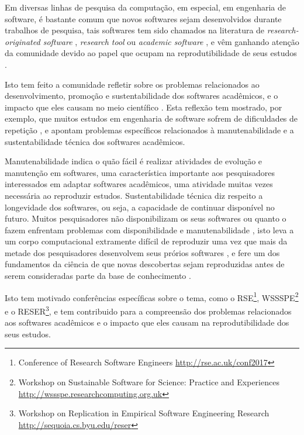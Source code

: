 
Em diversas linhas de pesquisa da computação, em especial, em engenharia de
software, é bastante comum que novos softwares sejam desenvolvidos durante
trabalhos de pesquisa, tais softwares tem sido chamados na literatura de {\it
research-originated software} \cite{Kon2011}, {\it research tool}
\cite{Portillo12} ou {\it academic software} \cite{allen2017engineering}, e vêm
ganhando atenção da comunidade devido ao papel que ocupam na reprodutibilidade
de seus estudos \cite{Peng2011}.

Isto tem feito a comunidade refletir sobre os problemas relacionados ao
desenvolvimento, promoção e sustentabilidade dos softwares acadêmicos, e o
impacto que eles causam no meio científico \cite{allen2017engineering}. Esta
reflexão tem mostrado, por exemplo, que muitos estudos em engenharia de
software sofrem de dificuldades de repetição \cite{Tang2016}, e apontam
problemas específicos relacionados à manutenabilidade e a sustentabilidade técnica
dos softwares acadêmicos.

Manutenabilidade indica o quão fácil é realizar atividades de evolução e
manutenção em softwares, uma característica importante aos pesquisadores
interessados em adaptar softwares acadêmicos, uma atividade muitas vezes
necessária ao reproduzir estudos. Sustentabilidade técnica diz respeito a
longevidade dos softwares, ou seja, a capacidade de continuar disponível no
futuro. Muitos pesquisadores não disponibilizam os seus softwares
\cite{robles2010replicating, amann2015software} ou quanto o fazem enfrentam
problemas com disponibilidade e manutenabilidade \cite{Prlic2012}, isto leva a
um corpo computacional extramente difícil de reproduzir uma vez que mais da
metade dos pesquisadores desenvolvem seus prórios softwares
\cite{hettrick_2014_14809}, e fere um dos fundamentos da ciência de que novas
descobertas sejam reproduzidas antes de serem consideradas parte da base de
conhecimento \cite{Stodden2009}.

Isto tem motivado conferências específicas sobre o tema, como o
RSE\footnote{Conference of Research Software Engineers
\url{http://rse.ac.uk/conf2017}}, WSSSPE\footnote{Workshop on Sustainable
Software for Science: Practice and Experiences
\url{http://wssspe.researchcomputing.org.uk}} e o RESER\footnote{Workshop on
Replication in Empirical Software Engineering Research
\url{http://sequoia.cs.byu.edu/reser}}, e tem contribuido para a compreensão
dos problemas relacionados aos softwares acadêmicos e o impacto que eles causam
na reprodutibilidade dos seus estudos.

